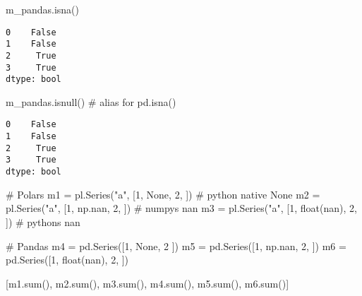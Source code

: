 \documentclass[
  letterpaper,
  DIV=11,
  numbers=noendperiod]{scrartcl}
\newenvironment{Shaded}{\begin{snugshade}}{\end{snugshade}}
\newcommand{\BuiltInTok}[1]{\textcolor[rgb]{0.00,0.23,0.31}{#1}}
\newcommand{\CommentTok}[1]{\textcolor[rgb]{0.37,0.37,0.37}{#1}}
\newcommand{\DecValTok}[1]{\textcolor[rgb]{0.68,0.00,0.00}{#1}}
\newcommand{\NormalTok}[1]{\textcolor[rgb]{0.00,0.23,0.31}{#1}}
\newcommand{\OperatorTok}[1]{\textcolor[rgb]{0.37,0.37,0.37}{#1}}
\newcommand{\StringTok}[1]{\textcolor[rgb]{0.13,0.47,0.30}{#1}}
\newcommand{\VariableTok}[1]{\textcolor[rgb]{0.07,0.07,0.07}{#1}}
\begin{document}
\begin{Shaded}
\begin{Highlighting}[]
\NormalTok{m\_pandas.isna()}
\end{Highlighting}
\end{Shaded}

\begin{verbatim}
0    False
1    False
2     True
3     True
dtype: bool
\end{verbatim}

\begin{Shaded}
\begin{Highlighting}[]
\NormalTok{m\_pandas.isnull() }\CommentTok{\# alias for pd.isna()}
\end{Highlighting}
\end{Shaded}

\begin{verbatim}
0    False
1    False
2     True
3     True
dtype: bool
\end{verbatim}

\begin{Shaded}
\begin{Highlighting}[]
\CommentTok{\# Polars}
\NormalTok{m1 }\OperatorTok{=}\NormalTok{ pl.Series(}\StringTok{"a"}\NormalTok{, [}\DecValTok{1}\NormalTok{, }\VariableTok{None}\NormalTok{, }\DecValTok{2}\NormalTok{, ]) }\CommentTok{\# python native None}
\NormalTok{m2 }\OperatorTok{=}\NormalTok{ pl.Series(}\StringTok{"a"}\NormalTok{, [}\DecValTok{1}\NormalTok{, np.nan, }\DecValTok{2}\NormalTok{, ]) }\CommentTok{\# numpy\textquotesingle{}s nan}
\NormalTok{m3 }\OperatorTok{=}\NormalTok{ pl.Series(}\StringTok{"a"}\NormalTok{, [}\DecValTok{1}\NormalTok{, }\BuiltInTok{float}\NormalTok{(}\StringTok{\textquotesingle{}nan\textquotesingle{}}\NormalTok{), }\DecValTok{2}\NormalTok{, ]) }\CommentTok{\# python\textquotesingle{}s nan}

\CommentTok{\# Pandas}
\NormalTok{m4 }\OperatorTok{=}\NormalTok{ pd.Series([}\DecValTok{1}\NormalTok{, }\VariableTok{None}\NormalTok{, }\DecValTok{2}\NormalTok{ ])}
\NormalTok{m5 }\OperatorTok{=}\NormalTok{ pd.Series([}\DecValTok{1}\NormalTok{, np.nan, }\DecValTok{2}\NormalTok{, ])}
\NormalTok{m6 }\OperatorTok{=}\NormalTok{ pd.Series([}\DecValTok{1}\NormalTok{, }\BuiltInTok{float}\NormalTok{(}\StringTok{\textquotesingle{}nan\textquotesingle{}}\NormalTok{), }\DecValTok{2}\NormalTok{, ])}
\end{Highlighting}
\end{Shaded}

\begin{Shaded}
\begin{Highlighting}[]
\NormalTok{[m1.}\BuiltInTok{sum}\NormalTok{(), m2.}\BuiltInTok{sum}\NormalTok{(), m3.}\BuiltInTok{sum}\NormalTok{(), m4.}\BuiltInTok{sum}\NormalTok{(), m5.}\BuiltInTok{sum}\NormalTok{(), m6.}\BuiltInTok{sum}\NormalTok{()]}
\end{Highlighting}
\end{Shaded}
\end{document}
